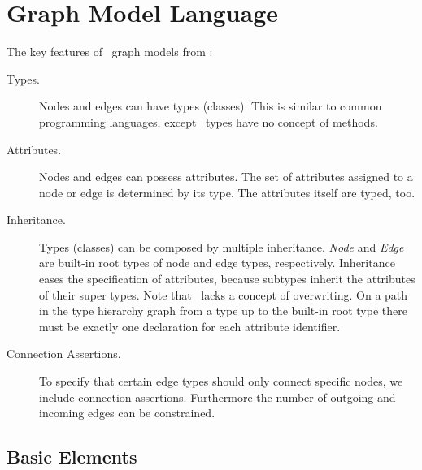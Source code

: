 \chapter{Graph Model Language}
The key features of \GrG\ graph models from \cite{geiss}:

\begin{description}
\item[Types.] Nodes and edges can have types (classes). This is similar to common programming languages, except \GrG\ types have no concept of methods. 
\item[Attributes.] Nodes and edges can possess attributes. The set of attributes assigned to a node or edge is determined by its type. The attributes itself are typed, too.
\item[Inheritance.] Types (classes) can be composed by multiple inheritance. \emph{Node} and \emph{Edge} are built-in root types of node and edge types, respectively. Inheritance eases the specification of attributes, because subtypes inherit the attributes of their super types. Note that \GrG\ lacks a concept of overwriting. On a path in the type hierarchy graph from a type up to the built-in root type there must be exactly one declaration for each attribute identifier.
\item[Connection Assertions.] To specify that certain edge types should only connect specific nodes, we include connection assertions. Furthermore the number of outgoing and incoming edges can be constrained.
\end{description}

\section{Basic Elements}

